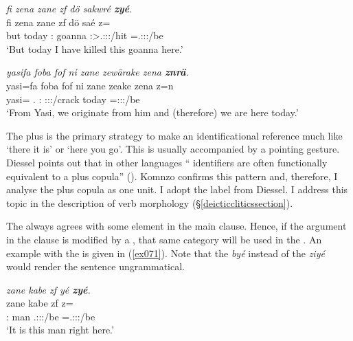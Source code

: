 \begin{exe}
	\ex \emph{fi zena zane zf dö sakwré \textbf{zyé}.}\\
	\gll fi zena zane zf dö saé z=\\
	but today \Dem:{\Prox} {\Imm} goanna \Fsg:\Sbj>\Tsg.\Masc:\Obj:\Rpst:\Pfv/hit \Prox=\Tsg.\Masc:\Sbj:\Nonpast:\Ipfv/be\\
	\trans `But today I have killed this goanna here.' 
	\label{ex068}
\end{exe}
\begin{exe}
	\ex \emph{yasifa foba fof ni zane zewärake zena \textbf{znrä}.}\\
	\gll yasi=fa foba fof ni zane zeake zena z=n\\
	yasi={\Abl} \Dist.{\Abl} {\Emph} {\Fnsg} \Dem:{\Prox} \Fpl:\Sbj:\Pst:\Ipfv/crack today \Prox=\Fpl:\Sbj:\Nonpast:\Ipfv/be\\
	\trans `From Yasi, we originate from him and (therefore) we are here today.'\\ 
	\label{ex070}
\end{exe}

The   plus  is the primary strategy to make an identificational reference much like  `there it is' or `here you go'. This is usually accompanied by a pointing gesture. Diessel points out that in other languages `` identifiers are often functionally equivalent to a  plus copula'' (\citeyear[10]{Diessel:2009tg}). Komnzo confirms this pattern and, therefore, I analyse the   plus copula as one unit. I adopt the label   from Diessel. I address this topic in the description of verb morphology (\S\ref{deicticcliticssection}).

The   always agrees with some element in the main clause. Hence, if the argument in the clause is modified by a  , that same  category will be used in the  . An example with the  is given in (\ref{ex071}). Note that the    \emph{byé} instead of the  \emph{ziyé} would render the sentence ungrammatical.

\begin{exe}
	\ex \emph{zane kabe zf yé \textbf{zyé}.}\\
	\gll zane kabe zf  z=\\
	\Dem:{\Prox} man {\Imm} \Tsg.\Masc:\Sbj:\Nonpast:\Ipfv/be \Prox=\Tsg.\Masc:\Sbj:\Nonpast:\Ipfv/be\\
	\trans `It is this man right here.' 
	\label{ex071}
\end{exe}

